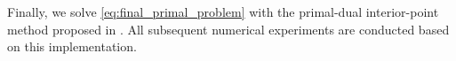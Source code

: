 Finally, we solve \eqref{eq:final_primal_problem} with the primal-dual interior-point method proposed in \citep{Skajaa2015pdinterior}. All subsequent numerical experiments are conducted based on this implementation.
























